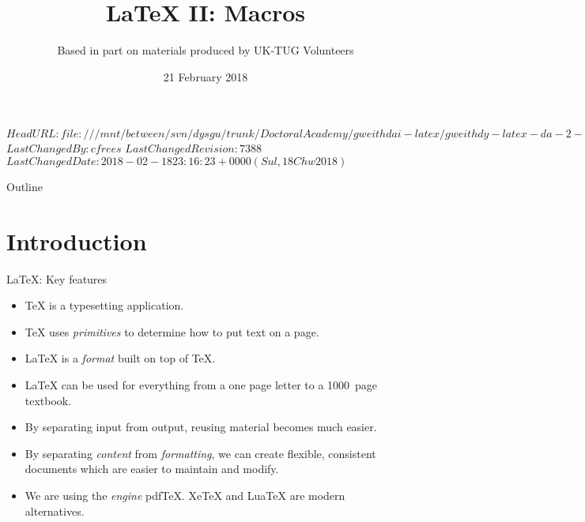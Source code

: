 \svnidlong
{$HeadURL: file:///mnt/between/svn/dysgu/trunk/DoctoralAcademy/gweithdai-latex/gweithdy-latex-da-2-macros/training.tex $}
{$LastChangedBy: cfrees $}
{$LastChangedRevision: 7388 $}
{$LastChangedDate: 2018-02-18 23:16:23 +0000 (Sul, 18 Chw 2018) $}



\title{\LaTeX{} II: Macros}
\subtitle{Based in part on materials produced by UK-TUG Volunteers}
\date{ 21 February 2018}




\begin{frame}
  \titlepage
\end{frame}

\maketitle


\tableofcontents

%
{
  \begin{frame}{Outline}
	\tableofcontents
  \end{frame}
}

\section{Introduction}

\begin{frame}{\LaTeX{}: Key features}

  \begin{itemize}
	\item \TeX{} is a typesetting application.
	\item \TeX{} uses \emph{primitives} to determine how to put text on a page.
	\item \LaTeX{} is  a \emph{format} built on top of \TeX{}.
	\item \LaTeX{} can be used for everything from a one page letter to a 1000~page textbook.
	\item By separating input from output, reusing material becomes much easier.
	\item By separating \emph{content} from \emph{formatting}, we can create flexible, consistent documents which are easier to maintain and modify.
	\item We are using the \emph{engine} pdf\TeX{}.
	Xe\TeX{} and Lua\TeX{} are modern alternatives.
  \end{itemize}

\end{frame}

